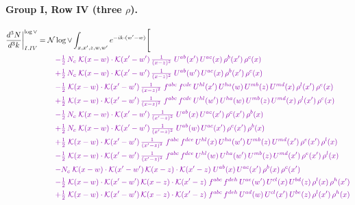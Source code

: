 \documentclass[10pt]{article}
\numberwithin{equation}{section}
\newcommand{\NNv}{\mathcal N\log\vee}
\begin{document}
\paragraph{Group I, Row IV (three $\rho$).}
\begin{align}
\frac{d^3N}{d^3k}\bigg|^{\log\vee}_{I.IV}={}&\NNv\int_{x,x',z,w,w'}e^{-ik\cdot(w'-w)}\Bigg[\notag\\
&\quad{\color{CC}-\tfrac{1}{2}\,N_c\;\mathcal{K}(x-w)\cdot\mathcal{K}(x'-w')\,\tfrac{1}{(x-z)^{2}}\;U^{ab}(x')\,U^{ac}(x)\,\rho^{b}(x')\,\rho^{c}(x)}\notag\\
&\quad{\color{CC}+\tfrac{1}{2}\,N_c\;\mathcal{K}(x-w)\cdot\mathcal{K}(x'-w')\,\tfrac{1}{(x-z)^{2}}\;U^{ab}(w')\,U^{ac}(x)\,\rho^{b}(x')\,\rho^{c}(x)}\notag\\
&\quad{\color{CC}-\tfrac{1}{2}\;\mathcal{K}(x-w)\cdot\mathcal{K}(x'-w')\,\tfrac{1}{(x-z)^{2}}\;f^{abc}\,f^{cde}\,U^{hl}(x')\,U^{ha}(w)\,U^{mb}(z)\,U^{md}(x)\,\rho^{l}(x')\,\rho^{e}(x)}\notag\\
&\quad{\color{CC}+\tfrac{1}{2}\;\mathcal{K}(x-w)\cdot\mathcal{K}(x'-w')\,\tfrac{1}{(x-z)^{2}}\;f^{abc}\,f^{cde}\,U^{hl}(w')\,U^{ha}(w)\,U^{mb}(z)\,U^{md}(x)\,\rho^{l}(x')\,\rho^{e}(x)}\notag\\
&\quad{\color{CC}-\tfrac{1}{2}\,N_c\;\mathcal{K}(x-w)\cdot\mathcal{K}(x'-w')\,\tfrac{1}{(x'-z)^{2}}\;U^{ab}(x)\,U^{ac}(x')\,\rho^{c}(x')\,\rho^{b}(x)}\notag\\
&\quad{\color{CC}+\tfrac{1}{2}\,N_c\;\mathcal{K}(x-w)\cdot\mathcal{K}(x'-w')\,\tfrac{1}{(x'-z)^{2}}\;U^{ab}(w)\,U^{ac}(x')\,\rho^{c}(x')\,\rho^{b}(x)}\notag\\
&\quad{\color{CC}+\tfrac{1}{2}\;\mathcal{K}(x-w)\cdot\mathcal{K}(x'-w')\,\tfrac{1}{(x'-z)^{2}}\;f^{abc}\,f^{dce}\,U^{hl}(x)\,U^{ha}(w')\,U^{mb}(z)\,U^{md}(x')\,\rho^{e}(x')\,\rho^{l}(x)}\notag\\
&\quad{\color{CC}-\tfrac{1}{2}\;\mathcal{K}(x-w)\cdot\mathcal{K}(x'-w')\,\tfrac{1}{(x'-z)^{2}}\;f^{abc}\,f^{dce}\,U^{hl}(w)\,U^{ha}(w')\,U^{mb}(z)\,U^{md}(x')\,\rho^{e}(x')\,\rho^{l}(x)}\notag\\
&\quad{\color{CC}-N_c\;\mathcal{K}(x-w)\cdot\mathcal{K}(x'-w')\,\mathcal{K}(x-z)\cdot\mathcal{K}(x'-z)\;U^{ab}(x)\,U^{ac}(x')\,\rho^{b}(x)\,\rho^{c}(x')}\notag\\
&\quad{\color{CC}-\tfrac{1}{2}\;\mathcal{K}(x-w)\cdot\mathcal{K}(x'-w')\,\mathcal{K}(x-z)\cdot\mathcal{K}(x'-z)\;f^{abc}\,f^{deh}\,U^{ae}(w')\,U^{cl}(x)\,U^{bd}(z)\,\rho^{l}(x)\,\rho^{h}(x')}\notag\\
&\quad{\color{CC}+\tfrac{1}{2}\;\mathcal{K}(x-w)\cdot\mathcal{K}(x'-w')\,\mathcal{K}(x-z)\cdot\mathcal{K}(x'-z)\;f^{abc}\,f^{deh}\,U^{ad}(w)\,U^{cl}(x')\,U^{be}(z)\,\rho^{l}(x')\,\rho^{h}(x)}\notag\\

\end{align}
\end{document}
